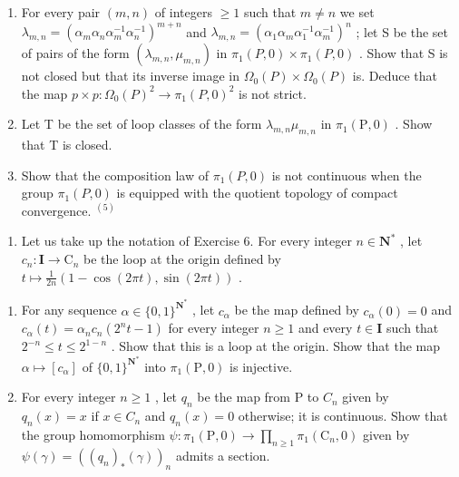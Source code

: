 \begin{enumerate}
\def\labelenumi{\alph{enumi})}
\item
  For every pair \((m,n)\) of integers \(\geqslant 1\) such that \(m \neq n\) we set \(\lambda_{m,n} = (\alpha_{m}\alpha_{n}\alpha_{m}^{-1}\alpha_{n}^{-1})^{m+n}\) and \(\lambda_{m,n} = (\alpha_{1}\alpha_{m}\alpha_{1}^{-1}\alpha_{m}^{-1})^{n}\) ; let S be the set of pairs of the form \((\lambda_{m,n},\mu_{m,n})\) in \(\pi_{1}(P,0)\times\pi_{1}(P,0)\) . Show that S is not closed but that its inverse image in \(\Omega_{0}(P)\times\Omega_{0}(P)\) is. Deduce that the map \(p\times p\colon\Omega_{0}(P)^{2}\to\pi_{1}(P,0)^{2}\) is not strict.
\item
  Let T be the set of loop classes of the form \(\lambda_{m,n}\mu_{m,n}\) in \(\pi_1(\mathrm{P},0)\) . Show that T is closed.
\item
  Show that the composition law of \(\pi_{1}(P,0)\) is not continuous when the group \(\pi_{1}(P,0)\) is equipped with the quotient topology of compact convergence. \(^{(5)}\)
\end{enumerate}

\begin{enumerate}
\def\labelenumi{\arabic{enumi})}
\setcounter{enumi}{8}
\tightlist
\item
  Let us take up the notation of Exercise 6. For every integer \(n \in \mathbf{N}^*\) , let \(c_n: \mathbf{I} \to \mathrm{C}_n\) be the loop at the origin defined by \(t \mapsto \frac{1}{2n}(1 - \cos(2\pi t), \sin(2\pi t))\) .\\
\end{enumerate}

\begin{enumerate}
\def\labelenumi{\alph{enumi})}
\item
  For any sequence \(\alpha \in \{0,1\}^{\mathbf{N}^*}\) , let \(c_\alpha\) be the map defined by \(c_\alpha(0) = 0\) and \(c_\alpha(t) = \alpha_n c_n (2^n t - 1)\) for every integer \(n \geqslant 1\) and every \(t \in \mathbf{I}\) such that \(2^{-n} \leqslant t \leqslant 2^{1-n}\) . Show that this is a loop at the origin. Show that the map \(\alpha \mapsto [c_\alpha]\) of \(\{0,1\}^{\mathbf{N}^*}\) into \(\pi_1(\mathrm{P},0)\) is injective.
\item
  For every integer \(n \geqslant 1\) , let \(q_{n}\) be the map from P to \(C_{n}\) given by \(q_{n}(x) = x\) if \(x \in C_{n}\) and \(q_{n}(x) = 0\) otherwise; it is continuous. Show that the group homomorphism \(\psi: \pi_{1}(\mathrm{P}, 0) \to \prod_{n \geqslant 1} \pi_{1}(\mathrm{C}_{n}, 0)\) given by \(\psi(\gamma) = ((q_{n})_{*}(\gamma))_{n}\) admits a section.
\end{enumerate}

